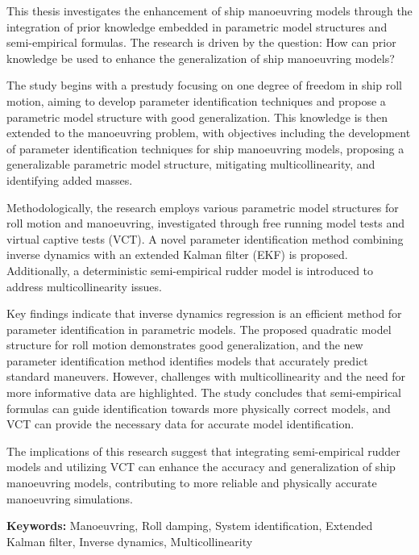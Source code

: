 This thesis investigates the enhancement of ship manoeuvring models through the integration of prior knowledge embedded in parametric model structures and semi-empirical formulas. The research is driven by the question: How can prior knowledge be used to enhance the generalization of ship manoeuvring models?

The study begins with a prestudy focusing on one degree of freedom in ship roll motion, aiming to develop parameter identification techniques and propose a parametric model structure with good generalization. This knowledge is then extended to the manoeuvring problem, with objectives including the development of parameter identification techniques for ship manoeuvring models, proposing a generalizable parametric model structure, mitigating multicollinearity, and identifying added masses.

Methodologically, the research employs various parametric model structures for roll motion and manoeuvring, investigated through free running model tests and virtual captive tests (VCT). A novel parameter identification method combining inverse dynamics with an extended Kalman filter (EKF) is proposed. Additionally, a deterministic semi-empirical rudder model is introduced to address multicollinearity issues.

Key findings indicate that inverse dynamics regression is an efficient method for parameter identification in parametric models. The proposed quadratic model structure for roll motion demonstrates good generalization, and the new parameter identification method identifies models that accurately predict standard maneuvers. However, challenges with multicollinearity and the need for more informative data are highlighted. The study concludes that semi-empirical formulas can guide identification towards more physically correct models, and VCT can provide the necessary data for accurate model identification.

The implications of this research suggest that integrating semi-empirical rudder models and utilizing VCT can enhance the accuracy and generalization of ship manoeuvring models, contributing to more reliable and physically accurate manoeuvring simulations.


\vspace{0.3cm}
\noindent\textbf{Keywords:} Manoeuvring, Roll damping, System identification, Extended Kalman filter, Inverse dynamics, Multicollinearity
\cleardoublepage
